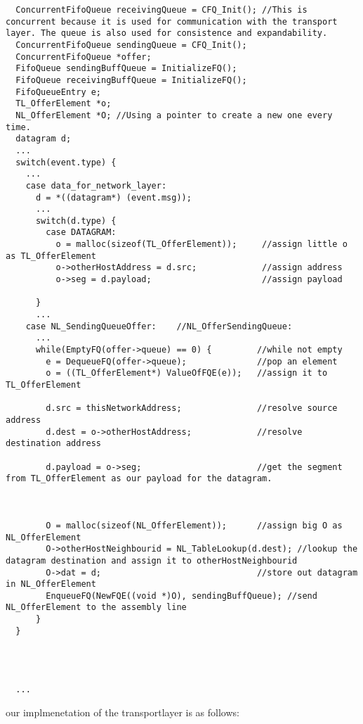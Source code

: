 \begin{lstlisting}
  ConcurrentFifoQueue receivingQueue = CFQ_Init(); //This is concurrent because it is used for communication with the transport layer. The queue is also used for consistence and expandability.
  ConcurrentFifoQueue sendingQueue = CFQ_Init();
  ConcurrentFifoQueue *offer;
  FifoQueue sendingBuffQueue = InitializeFQ();
  FifoQueue receivingBuffQueue = InitializeFQ();
  FifoQueueEntry e;
  TL_OfferElement *o;
  NL_OfferElement *O; //Using a pointer to create a new one every time.
  datagram d;
  ...
  switch(event.type) {
    ...
    case data_for_network_layer:
      d = *((datagram*) (event.msg));
      ...
      switch(d.type) {
        case DATAGRAM:
          o = malloc(sizeof(TL_OfferElement));     //assign little o as TL_OfferElement
          o->otherHostAddress = d.src;             //assign address
          o->seg = d.payload;                      //assign payload

      }
      ...
    case NL_SendingQueueOffer:    //NL_OfferSendingQueue:
      ...
      while(EmptyFQ(offer->queue) == 0) {         //while not empty
        e = DequeueFQ(offer->queue);              //pop an element
        o = ((TL_OfferElement*) ValueOfFQE(e));   //assign it to TL_OfferElement

        d.src = thisNetworkAddress;               //resolve source address
        d.dest = o->otherHostAddress;             //resolve destination address

        d.payload = o->seg;                       //get the segment from TL_OfferElement as our payload for the datagram.



        O = malloc(sizeof(NL_OfferElement));      //assign big O as NL_OfferElement
        O->otherHostNeighbourid = NL_TableLookup(d.dest); //lookup the datagram destination and assign it to otherHostNeighbourid
        O->dat = d;                               //store out datagram in NL_OfferElement
        EnqueueFQ(NewFQE((void *)O), sendingBuffQueue); //send NL_OfferElement to the assembly line
      }
  }




  ...

\end{lstlisting}

our implmenetation of the transportlayer is as follows:

\begin{lstlisting}
\end{lstlisting}

